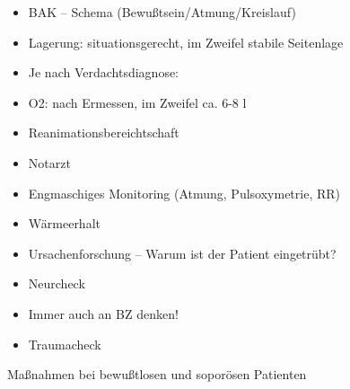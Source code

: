 \documentclass{article}
\begin{document}
\begin{itemize}
\item BAK -- Schema  (Bewu{\ss}tsein/Atmung/Kreislauf)

\item Lagerung: situationsgerecht, im Zweifel stabile Seitenlage 

\item Je nach Verdachtsdiagnose: 

\end{itemize}
\begin{itemize}
\item O2: nach Ermessen, im Zweifel ca. 6-8 l

\item Reanimationsbereichtschaft

\item Notarzt 

\end{itemize}
\begin{itemize}
\item Engmaschiges Monitoring (Atmung, Pulsoxymetrie, RR)

\item W\"armeerhalt

\item Ursachenforschung -- Warum ist der Patient eingetr\"ubt?

\item Neurcheck

\end{itemize}
\begin{itemize}
\item Immer auch an BZ denken!

\end{itemize}
\begin{itemize}
\item Traumacheck

\end{itemize}
Ma{\ss}nahmen bei bewu{\ss}tlosen und sopor\"osen Patienten
\end{document}
